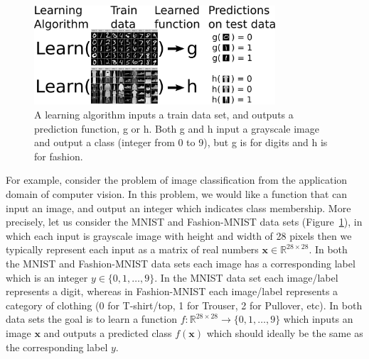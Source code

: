 \documentclass[12pt]{article}
\begin{document}
\begin{figure} 
  \centering
  \includegraphics[width=0.8\textwidth]{drawing-mnist-train-test.pdf}
  \caption{A learning algorithm inputs a train data set, and outputs a
    prediction function, g or h. Both g and h input a grayscale image
    and output a class (integer from 0 to 9), but g is for  
    digits and h is for fashion.}
  \label{fig:drawing-mnist-train-test}
\end{figure}

For example, consider the problem of image classification from the
application domain of computer vision. In this problem, we would like
a function that can input an image, and output an integer which
indicates class membership. More precisely, let us consider the MNIST
and Fashion-MNIST data sets
(Figure~\ref{fig:drawing-mnist-train-test}), in which each input is
grayscale image with height and width of 28 pixels
\citep{LeCun1998,Xiao2017} then we typically represent each input as a
matrix of real numbers $\mathbf x\in\mathbb R^{28\times 28}$. In both
the MNIST and Fashion-MNIST data sets each image has a corresponding
label which is an integer $y\in\{0,1,\dots,9\}$. In the MNIST data set
each image/label represents a digit, whereas in Fashion-MNIST each
image/label represents a category of clothing (0 for T-shirt/top, 1
for Trouser, 2 for Pullover, etc).  In both data sets the goal is to
learn a function
$f:\mathbb R^{28\times 28}\rightarrow \{0,1,\dots, 9\}$ which inputs
an image $\mathbf x$ and outputs a predicted class $f(\mathbf x)$
which should ideally be the same as the corresponding label $y$.
\end{document}
